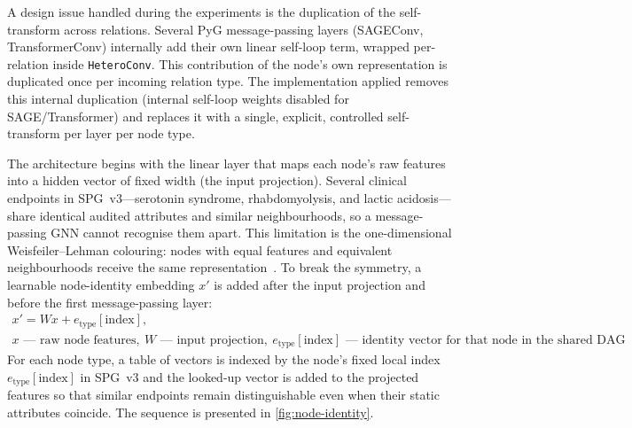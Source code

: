 A design issue handled during the experiments is the duplication of the self-transform 
across relations. 
Several PyG message-passing layers (SAGEConv, TransformerConv) internally add their 
own linear self-loop term,
 wrapped per-relation inside \texttt{HeteroConv}. This contribution of the node’s 
 own representation is duplicated once 
 per incoming relation type. The implementation applied removes this internal duplication 
(internal self-loop weights disabled for SAGE/Transformer) and replaces it with a single, 
explicit, 
controlled self-transform per layer per node type. 

The architecture begins with the linear layer that maps each node’s raw features into a hidden vector of fixed width (the input projection). 
Several clinical endpoints in SPG~v3---serotonin syndrome, rhabdomyolysis, and lactic acidosis---share identical 
audited attributes and similar neighbourhoods, so a message-passing GNN cannot recognise them apart. 
This limitation is the one-dimensional Weisfeiler--Lehman colouring: nodes with equal features and equivalent neighbourhoods 
receive the same representation~\cite{wojcik2026grafowe}. To break the symmetry, a learnable node-identity 
embedding $x'$ is added after the input projection and before the first message-passing layer:
\begin{equation}
\begin{gathered}
x' = Wx + e_{\mathrm{type}}[\mathrm{index}], \\[0.3em]
{\scriptstyle
x\text{ --- raw node features},\ 
W\text{ --- input projection},\ 
e_{\mathrm{type}}[\mathrm{index}]\text{ --- identity vector for that node in the shared DAG}
}
\end{gathered}
\label{eq:node-identity}
\end{equation}
For each node type, a table of vectors is indexed by the node's fixed local index
$e_{\mathrm{type}}[\mathrm{index}]$ in SPG~v3 and
the looked-up vector is added to the projected features so that similar endpoints remain 
distinguishable even
when their static attributes coincide. The sequence is presented in \cref{fig:node-identity}.

